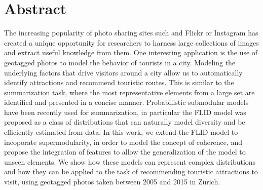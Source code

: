 \chapter*{Abstract}

The increasing popularity of photo sharing sites such and Flickr or Instagram has created a unique opportunity for researchers to harness large collections of images and extract useful knowledge from them. One interesting application is the use of geotagged photos to model the behavior of tourists in a city. Modeling the underlying factors that drive visitors around a city allow us to automatically identify attractions and recommend touristic routes. This is similar to the summarization task, where the most representative elements from a large set are identified and presented in a concise manner. Probabilistic submodular models have been recently used for summarization, in particular the FLID model was proposed as a class of distributions that can naturally model diversity and be efficiently estimated from data. In this work, we extend the FLID model to incoporate supermodularity, in order to model the concept of coherence, and propose the integration of features to allow the generalization of the model to unseen elements. We show how these models can represent complex distributions and how they can be applied to the task of recommending touristic attractions to visit, using geotagged photos taken between 2005 and 2015 in Zürich.